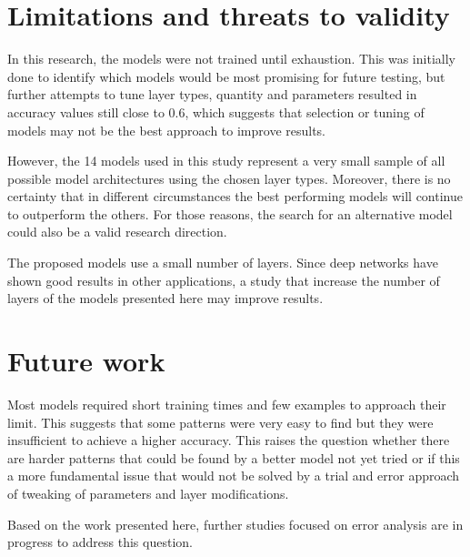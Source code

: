 \section{Limitations and threats to validity}

In this research, the models were not trained until exhaustion. This was initially done to identify which models would be most promising for future testing, but further attempts to tune layer types, quantity and parameters resulted in accuracy values still close to 0.6, which suggests that selection or tuning of models may not be the best approach to improve results.

However, the 14 models used in this study represent a very small sample of all possible model architectures using the chosen layer types. Moreover, there is no certainty that in different circumstances the best performing models will continue to outperform the others. For those reasons, the search for an alternative model could also be a valid research direction.

The proposed models use a small number of layers. Since deep networks have shown good results in other applications, a study that increase the number of layers of the models presented here may improve results.

\section{Future work}

Most models required short training times and few examples to approach their limit.
This suggests that some patterns were very easy to find but they were insufficient to achieve a higher accuracy.
This raises the question whether there are harder patterns that could be found by a better model not yet tried or if this a more fundamental issue that would not be solved by a trial and error approach of tweaking of parameters and layer modifications.

Based on the work presented here, further studies focused on error analysis are in progress to address this question.